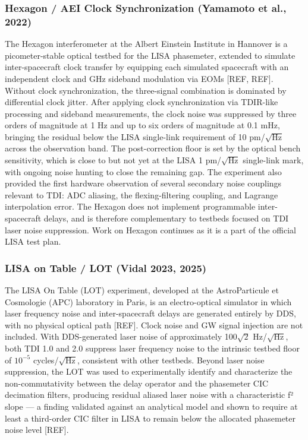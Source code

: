 \subsubsection{Hexagon / AEI Clock Synchronization (Yamamoto et al., 2022)}
The Hexagon interferometer at the Albert Einstein Institute in Hannover is a picometer-stable optical testbed for the LISA phasemeter, extended to simulate inter-spacecraft clock transfer by equipping each simulated spacecraft with an independent clock and GHz sideband modulation via EOMs [REF, REF]. Without clock synchronization, the three-signal combination is dominated by differential clock jitter. After applying clock synchronization via TDIR-like processing and sideband measurements, the clock noise was suppressed by three orders of magnitude at 1 Hz and up to six orders of magnitude at 0.1 mHz, bringing the residual below the LISA single-link requirement of 10 pm/$\sqrt{\text{Hz}}$ across the observation band. The post-correction floor is set by the optical bench sensitivity, which is close to but not yet at the LISA 1 pm/$\sqrt{\text{Hz}}$ single-link mark, with ongoing noise hunting to close the remaining gap. The experiment also provided the first hardware observation of several secondary noise couplings relevant to TDI: \ac{ADC} aliasing, the flexing-filtering coupling, and Lagrange interpolation error. The Hexagon does not implement programmable inter-spacecraft delays, and is therefore complementary to testbeds focused on TDI laser noise suppression. Work on Hexagon continues as it is a part of the official LISA test plan.

\subsubsection{LISA on Table / LOT (Vidal 2023, 2025)}
The LISA On Table (LOT) experiment, developed at the AstroParticule et Cosmologie (APC) laboratory in Paris, is an electro-optical simulator in which laser frequency noise and inter-spacecraft delays are generated entirely by \ac{DDS}, with no physical optical path [REF]. Clock noise and GW signal injection are not included. With DDS-generated laser noise of approximately 100$\sqrt{2}$ Hz/$\sqrt{\text{Hz}}$, both TDI 1.0 and 2.0 suppress laser frequency noise to the intrinsic testbed floor of $10^{-5}$ cycles/$\sqrt{\text{Hz}}$, consistent with other testbeds. Beyond laser noise suppression, the LOT was used to experimentally identify and characterize the non-commutativity between the delay operator and the phasemeter CIC decimation filters, producing residual aliased laser noise with a characteristic f² slope — a finding validated against an analytical model and shown to require at least a third-order CIC filter in LISA to remain below the allocated phasemeter noise level [REF].

